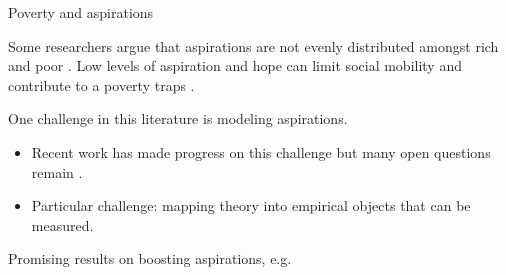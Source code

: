 \documentclass[aspectratio=169, 10pt, handout]{beamer}
\newenvironment{wideitemize}{\itemize\addtolength{\itemsep}{10pt}}{\enditemize}
\begin{document}
\begin{frame}{Poverty and aspirations}

\begin{wideitemize}

	\item Some researchers argue that aspirations are not evenly distributed amongst rich and poor \citep{appadurai2004capacity}. Low levels of aspiration and hope can limit social mobility and contribute to a poverty traps \citep{ray2006aspirations,dalton2015poverty,genicot2017aspirations}.

	\item One challenge in this literature is modeling aspirations. 
	
	\begin{itemize}
	    
	    \item Recent work has made progress on this challenge but many open questions remain \citep{dalton2015poverty,genicot2017aspirations,lybbert2018poverty}. 
	    
	    \item Particular challenge: mapping theory into empirical objects that can be measured.
        
	\end{itemize}
	
	\item Promising results on boosting aspirations, e.g.\ \cite{tanguy2014future}

		
\end{wideitemize}

\end{frame}
\end{document}
